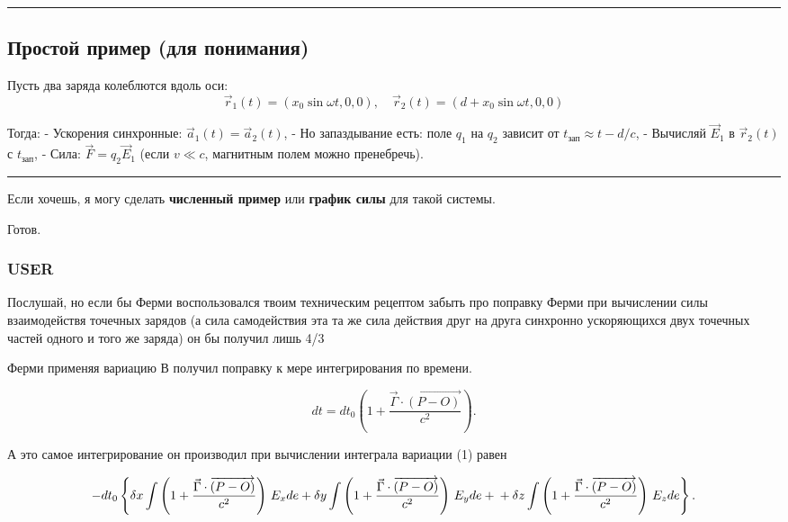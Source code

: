 \documentclass[11pt]{article}
\begin{document}
\begin{center}\rule{0.5\linewidth}{\linethickness}\end{center}

\subsection{ Простой пример (для понимания)}
Пусть два заряда колеблются вдоль оси: \[
\vec{r}_1(t) = (x_0 \sin \omega t, 0, 0), \quad
\vec{r}_2(t) = (d + x_0 \sin \omega t, 0, 0)
\]

Тогда: - Ускорения синхронные: \(\vec{a}_1(t) = \vec{a}_2(t)\), - Но
запаздывание есть: поле \(q_1\) на \(q_2\) зависит от
\(t_{\text{зап}} \approx t - d/c\), - Вычисляй \(\vec{E}_1\) в
\(\vec{r}_2(t)\) с \(t_{\text{зап}}\), - Сила:
\(\vec{F} = q_2 \vec{E}_1\) (если \(v \ll c\), магнитным полем можно
пренебречь).

\begin{center}\rule{0.5\linewidth}{\linethickness}\end{center}

Если хочешь, я могу сделать \textbf{численный пример} или \textbf{график
силы} для такой системы.

Готов.

    \subsubsection{USER}

Послушай, но если бы Ферми воспользовался твоим техническим рецептом
забыть про поправку Ферми при вычислении силы взаимодействя точечных
зарядов (а сила самодействия эта та же сила действия друг на друга
синхронно ускоряющихся двух точечных частей одного и того же заряда) он
бы получил лишь 4/3

Ферми применяя вариацию В получил поправку к мере интегрирования по
времени.

\[ dt = dt_0\left (1 + \frac{\vec {\Gamma} \cdot \overrightarrow{\left(P - O\right)}}{c^2}\right).\]

А это самое интегрирование он производил при вычислении интеграла
вариации (1) равен

\[ - dt_0\left\{
\delta x \int \left (1 + \frac{\vec {\Gamma} \cdot \overrightarrow{\left(P - O\right)}}{c^2}\right)\, E_x de
+
\delta y \int \left (1 + \frac{\vec {\Gamma} \cdot \overrightarrow{\left(P - O\right)}}{c^2}\right)\, E_y de
+ \\ +
\delta z \int \left (1 + \frac{\vec {\Gamma} \cdot \overrightarrow{\left(P - O\right)}}{c^2}\right)\, E_z de
\right\}.\]
\end{document}
